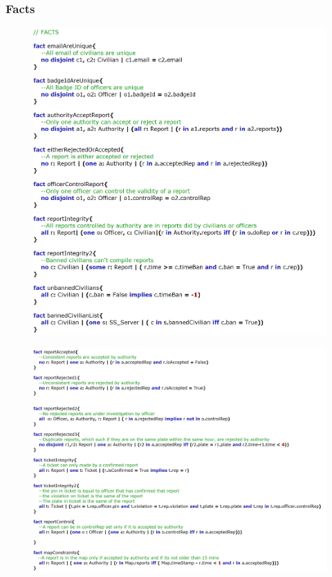 \documentclass[12pt,a4paper]{article}
\begin{document}
\subsubsection{Facts}

\begin{figure}[H]
\begin{adjustwidth}{-25mm}{-25mm}
				\centering
				\includegraphics[width=.75\paperwidth,height=.75\paperheight, keepaspectratio]{Images/Alloy/facts1}
\end{adjustwidth}
\end{figure}
\begin{figure}[H]
\begin{adjustwidth}{-25mm}{-25mm}
				\centering
				\includegraphics[width=.9\paperwidth,height=.9\paperheight, keepaspectratio]{Images/Alloy/facts2}
\end{adjustwidth}
\end{figure}
\end{document}

